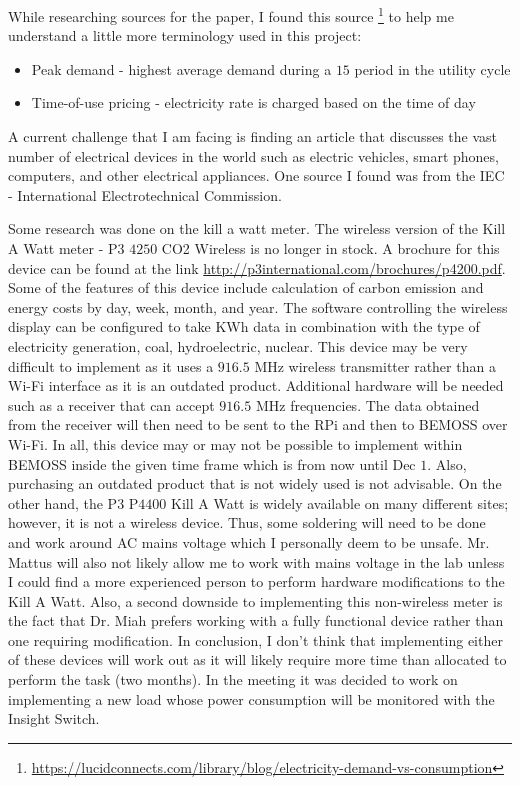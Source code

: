\documentclass[fontsize=11pt, %
                             paper=letter, %
                             twoside, %
                             captions=tableheading,
                             index=totoc,
                             hyperref]{labbook}
\begin{document}
\begin{addmargin}[0cm]{0cm}
While researching sources for the paper, I found this source \footnote{\url{https://lucidconnects.com/library/blog/electricity-demand-vs-consumption}} to help me understand a little more terminology used in this project:
\begin{itemize}
\item Peak demand - highest average demand during a $15$ period in the utility cycle
\item Time-of-use pricing - electricity rate is charged based on the time of day
\end{itemize}

A current challenge that I am facing is finding an article that discusses the vast number of electrical devices in the world such as electric vehicles, smart phones, computers, and other electrical appliances. One source I found was from the IEC - International Electrotechnical Commission.  

Some research was done on the kill a watt meter. The wireless version of the Kill A Watt meter - P$3$ $4250$ CO2 Wireless is no longer in stock. A brochure for this device can be found at the link \url{http://p3international.com/brochures/p4200.pdf}. Some of the features of this device include calculation of carbon emission and energy costs by day, week, month, and year. The software controlling the wireless display can be configured to take KWh data in combination with the type of electricity generation, coal, hydroelectric, nuclear. This device may be very difficult to implement as it uses a $916.5$ MHz wireless transmitter rather than a Wi-Fi interface as it is an outdated product. Additional hardware will be needed such as a receiver that can accept $916.5$ MHz frequencies. The data obtained from the receiver will then need to be sent to the RPi and then to BEMOSS over Wi-Fi. In all, this device may or may not be possible to implement within BEMOSS inside the given time frame which is from now until Dec $1$. Also, purchasing an outdated product that is not widely used is not advisable.
\smallbreak\noindent
On the other hand, the P$3$ P$4400$ Kill A Watt is widely available on many different sites; however, it is not a wireless device. Thus, some soldering will need to be done and work around AC mains voltage which I personally deem to be unsafe. Mr. Mattus will also not likely allow me to work with mains voltage in the lab unless I could find a more experienced person to perform hardware modifications to the Kill A Watt. Also, a second downside to implementing this non-wireless meter is the fact that Dr. Miah prefers working with a fully functional device rather than one requiring modification.
\smallbreak\noindent
In conclusion, I don't think that implementing either of these devices will work out as it will likely require more time than allocated to perform the task (two months). 
\smallbreak\noindent
In the meeting it was decided to work on implementing a new load whose power consumption will be monitored with the Insight Switch.


\end{addmargin}
\end{document}
